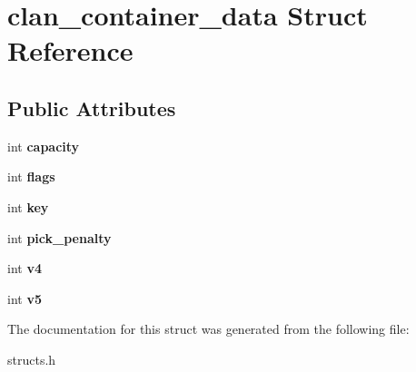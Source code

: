 \hypertarget{structclan__container__data}{\section{clan\-\_\-container\-\_\-data Struct Reference}
\label{structclan__container__data}
}
\subsection*{Public Attributes}
\begin{DoxyCompactItemize}
\item 
\hypertarget{structclan__container__data_ae36166a1a6b7f850f69228cf7309aaf5}{int {\bfseries capacity}}\label{structclan__container__data_ae36166a1a6b7f850f69228cf7309aaf5}

\item 
\hypertarget{structclan__container__data_a68c2f139e7f2c0358c45e0a2235aebb0}{int {\bfseries flags}}\label{structclan__container__data_a68c2f139e7f2c0358c45e0a2235aebb0}

\item 
\hypertarget{structclan__container__data_adc0d9496089fa8fb750b8ae2cc4ca9ae}{int {\bfseries key}}\label{structclan__container__data_adc0d9496089fa8fb750b8ae2cc4ca9ae}

\item 
\hypertarget{structclan__container__data_a218ac8d8fc4d28fbf4c9cf963efce513}{int {\bfseries pick\-\_\-penalty}}\label{structclan__container__data_a218ac8d8fc4d28fbf4c9cf963efce513}

\item 
\hypertarget{structclan__container__data_a61e6ca37b0ab1e631959ce2dc627676d}{int {\bfseries v4}}\label{structclan__container__data_a61e6ca37b0ab1e631959ce2dc627676d}

\item 
\hypertarget{structclan__container__data_a50443f46656539c044890e01ede56c0d}{int {\bfseries v5}}\label{structclan__container__data_a50443f46656539c044890e01ede56c0d}

\end{DoxyCompactItemize}


The documentation for this struct was generated from the following file\-:\begin{DoxyCompactItemize}
\item 
structs.\-h\end{DoxyCompactItemize}
